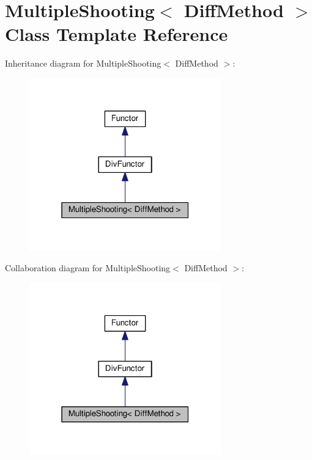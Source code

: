 \hypertarget{classMultipleShooting}{}\section{Multiple\+Shooting$<$ Diff\+Method $>$ Class Template Reference}
\label{classMultipleShooting}


Inheritance diagram for Multiple\+Shooting$<$ Diff\+Method $>$\+:
\nopagebreak
\begin{figure}[H]
\begin{center}
\leavevmode
\includegraphics[width=235pt]{classMultipleShooting__inherit__graph}
\end{center}
\end{figure}


Collaboration diagram for Multiple\+Shooting$<$ Diff\+Method $>$\+:
\nopagebreak
\begin{figure}[H]
\begin{center}
\leavevmode
\includegraphics[width=235pt]{classMultipleShooting__coll__graph}
\end{center}
\end{figure}
